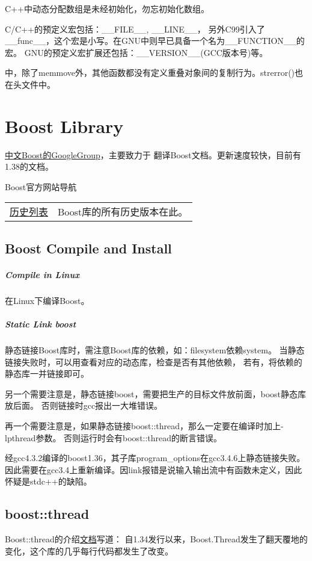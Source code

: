 C++中动态分配数组是未经初始化，勿忘初始化数组。

C/C++的预定义宏包括：\_\_FILE\_\_, \_\_LINE\_\_，
另外C99引入了\_\_func\_\_，这个宏是小写。在GNU中则早已具备一个名为\_\_FUNCTION\_\_的宏。
GNU的预定义宏扩展还包括：\_\_VERSION\_\_(GCC版本号)等。

中，除了memmove外，其他函数都没有定义重叠对象间的复制行为。strerror()也在头文件中。

\chapter{Boost Library}
\noindent\href{http://groups.google.com/group/boost\_doc\_translation}{中文Boost的GoogleGroup}，主要致力于
翻译Boost文档。更新速度较快，目前有1.38的文档。

Boost官方网站导航\\
\begin{tabular}{ll}
\href{http://www.boost.org/users/history/}{历史列表}  & Boost库的所有历史版本在此。\\
\end{tabular}

\section{Boost Compile and Install}
\paragraph{Compile in Linux}
在Linux下编译Boost。

\paragraph{Static Link boost}
静态链接Boost库时，需注意Boost库的依赖，如：filesystem依赖system。
当静态链接失败时，可以用查看对应的动态库，检查是否有其他依赖，
若有，将依赖的静态库一并链接即可。

另一个需要注意是，静态链接boost，需要把生产的目标文件放前面，boost静态库放后面。
否则链接时gcc报出一大堆错误。

再一个需要注意是，如果静态链接boost::thread，那么一定要在编译时加上-lpthread参数。
否则运行时会有boost::thread的断言错误。

经gcc4.3.2编译的boost1.36，其子库program\_options在gcc3.4.6上静态链接失败。
因此需要在gcc3.4上重新编译。因link报错是说输入输出流中有函数未定义，因此怀疑是stdc++的缺陷。

\section{boost::thread}
Boost::thread的介绍\href{http://www.boost.org/doc/libs/1\_38\_0/doc/html/thread/changes.html}{文档}写道：
自1.34发行以来，Boost.Thread发生了翻天覆地的变化，这个库的几乎每行代码都发生了改变。

